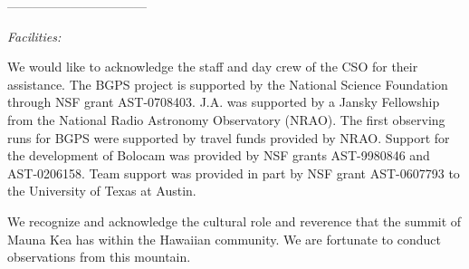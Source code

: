 \documentclass[12pt,preprint]{aastex}
\begin{document}
\noindent---------------------------------

{\it Facilities:} 

\acknowledgments

We would like to acknowledge the staff and day crew of the CSO for their
assistance. The BGPS project is supported by the National Science Foundation
through NSF grant AST-0708403. J.A. was supported by a Jansky Fellowship from
the National Radio Astronomy Observatory (NRAO). The first observing runs for
BGPS were supported by travel funds provided by NRAO. Support for the
development of Bolocam was provided by NSF grants AST-9980846 and AST-0206158.
Team support was provided in part by NSF grant AST-0607793 to the
University of Texas at Austin.

We recognize and acknowledge the cultural role and reverence that the
summit of Mauna Kea has within the Hawaiian community. We are
fortunate to conduct observations from this mountain.

\pagebreak
\end{document}
